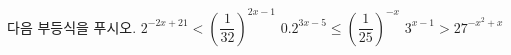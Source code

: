 다음 부등식을 푸시오.
 $2^{-2x+21}<\left(\dfrac{1}{32}\right)^{2x-1}$
 $0.2^{3x-5}\le\left(\dfrac{1}{25}\right)^{-x}$
 $3^{x-1}>27^{-x^{2}+x}$
